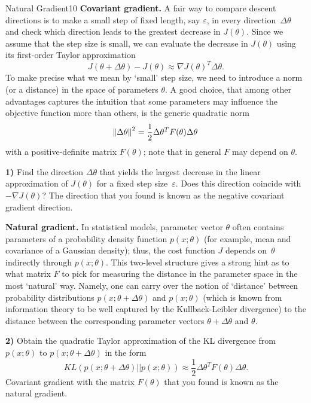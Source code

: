 \begin{questions}
\begin{question}[bonus]{Natural Gradient}{10}
\textbf{Covariant gradient.}
A fair way to compare descent directions is to make
a small step of fixed length, say $\varepsilon$,
in every direction~$\Delta \theta$ and check
which direction leads to the greatest decrease in $J(\theta)$.
Since we assume that the step size is small, we can evaluate
the decrease in $J(\theta)$ using its first-order Taylor approximation
\begin{equation*}
  J(\theta + \Delta \theta) - J(\theta) \approx
  \nabla J(\theta)^T \Delta \theta.
\end{equation*}
To make precise what we mean by `small' step size,
we need to introduce a norm (or a distance)
in the space of parameters $\theta$.
A good choice, that among other advantages captures the intuition
that some parameters may influence the objective function more
than others,
is the generic quadratic norm
\begin{equation*}
  \norm{\Delta \theta}^2 =
  \frac{1}{2}\Delta \theta^T F(\theta) \Delta \theta
\end{equation*}
with a positive-definite matrix $F(\theta)$;
note that in general $F$ may depend on $\theta$.

\textbf{1)} Find the direction $\Delta \theta$ that yields
the largest decrease in the linear approximation of $J(\theta)$
for a fixed step size~$\varepsilon$.
Does this direction coincide with $-\nabla J(\theta)$?
The direction that you found is known as the
negative covariant gradient direction.

\textbf{Natural gradient.}
In statistical models, parameter vector $\theta$ often
contains parameters of a probability density function $p(x; \theta)$
(for example, mean and covariance of a Gaussian density);
thus, the cost function $J$ depends on~$\theta$ indirectly
through $p(x; \theta)$.
This two-level structure gives a strong hint as to what matrix $F$
to pick for measuring the distance in the parameter space
in the most `natural' way.
Namely, one can carry over the notion of `distance' between
probability distributions $p(x; \theta + \Delta \theta)$
and $p(x; \theta)$ (which is known from information theory
to be well captured by the Kullback-Leibler divergence)
to the distance between the corresponding parameter vectors
$\theta + \Delta \theta$ and $\theta$.

\textbf{2)} Obtain the quadratic Taylor approximation
of the KL divergence
from $p(x; \theta)$ to $p(x; \theta + \Delta \theta)$ in the form
\begin{equation*}
  KL(p(x; \theta + \Delta \theta) || p(x; \theta)) \approx
  \frac{1}{2}\Delta \theta^T F(\theta) \Delta \theta.
\end{equation*}
Covariant gradient with the matrix $F(\theta)$ that you found
is known as the natural gradient.


\end{question}
\end{questions}
